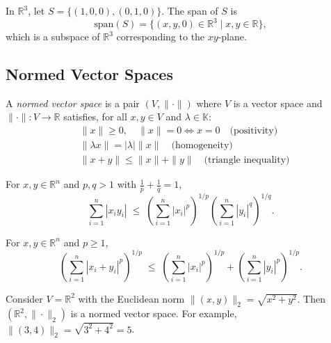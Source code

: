 \begin{example}
In $\mathbb{R}^3$, let $S=\{(1,0,0), (0,1,0)\}$.  
The span of $S$ is 
\begin{equation}
\mathrm{span}(S) = \{(x,y,0) \in \mathbb{R}^3 \mid x,y \in \mathbb{R}\},
\end{equation}
which is a subspace of $\mathbb{R}^3$ corresponding to the $xy$-plane.
\end{example}

\subsection{Normed Vector Spaces}

\begin{definition}
A \emph{normed vector space} is a pair $(V,\|\cdot\|)$ where $V$ is a vector space and $\|\cdot\|: V \to \mathbb{R}$ satisfies, for all $x,y \in V$ and $\lambda \in \mathbb{K}$:
\begin{align}
& \|x\| \geq 0, \quad \|x\| = 0 \iff x=0 \quad \text{(positivity)} \\
& \|\lambda x\| = |\lambda| \|x\| \quad \text{(homogeneity)} \\
& \|x+y\| \leq \|x\| + \|y\| \quad \text{(triangle inequality)}
\end{align}
\end{definition}

\begin{theorem}
For $x,y \in \mathbb{R}^n$ and $p,q > 1$ with $\tfrac{1}{p}+\tfrac{1}{q}=1$,  
\begin{equation}
\sum_{i=1}^n |x_i y_i| \;\leq\; \left( \sum_{i=1}^n |x_i|^p \right)^{1/p} 
\left( \sum_{i=1}^n |y_i|^q \right)^{1/q}.
\end{equation}
\end{theorem}

\begin{theorem}
For $x,y \in \mathbb{R}^n$ and $p \geq 1$,  
\begin{equation}
\left( \sum_{i=1}^n |x_i+y_i|^p \right)^{1/p} \;\leq\; 
\left( \sum_{i=1}^n |x_i|^p \right)^{1/p} + 
\left( \sum_{i=1}^n |y_i|^p \right)^{1/p}.
\end{equation}
\end{theorem}

\begin{example}
Consider $V=\mathbb{R}^2$ with the Euclidean norm $\|(x,y)\|_2=\sqrt{x^2+y^2}$.  
Then $(\mathbb{R}^2,\|\cdot\|_2)$ is a normed vector space.  
For example, $\|(3,4)\|_2=\sqrt{3^2+4^2}=5$.
\end{example}

